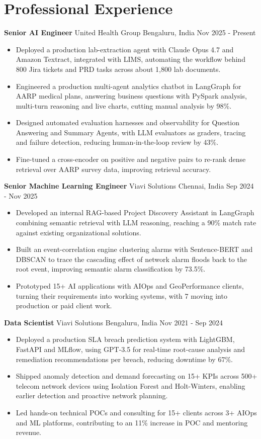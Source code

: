 \documentclass[10pt,a4paper]{article}
\newcommand{\role}[4]{\textbf{#1} \textbar{} #2 \hfill #3 \textbar{} #4\par}
\begin{document}
\section{Professional Experience}
\role{Senior AI Engineer}{United Health Group}{Bengaluru, India}{Nov 2025 - Present}
\begin{itemize}
  \item Deployed a production lab-extraction agent with Claude Opus 4.7 and Amazon Textract, integrated with LIMS, automating the workflow behind 800 Jira tickets and PRD tasks across about 1,800 lab documents.
  \item Engineered a production multi-agent analytics chatbot in LangGraph for AARP medical plans, answering business questions with PySpark analysis, multi-turn reasoning and live charts, cutting manual analysis by 98\%.
  \item Designed automated evaluation harnesses and observability for Question Answering and Summary Agents, with LLM evaluators as graders, tracing and failure detection, reducing human-in-the-loop review by 43\%.
  \item Fine-tuned a cross-encoder on positive and negative pairs to re-rank dense retrieval over AARP survey data, improving retrieval accuracy.
\end{itemize}
\vspace{3pt}
\role{Senior Machine Learning Engineer}{Viavi Solutions}{Chennai, India}{Sep 2024 - Nov 2025}
\begin{itemize}
  \item Developed an internal RAG-based Project Discovery Assistant in LangGraph combining semantic retrieval with LLM reasoning, reaching a 90\% match rate against existing organizational solutions.
  \item Built an event-correlation engine clustering alarms with Sentence-BERT and DBSCAN to trace the cascading effect of network alarm floods back to the root event, improving semantic alarm classification by 73.5\%.
  \item Prototyped 15+ AI applications with AIOps and GeoPerformance clients, turning their requirements into working systems, with 7 moving into production or paid client work.
\end{itemize}
\vspace{3pt}
\role{Data Scientist}{Viavi Solutions}{Bengaluru, India}{Nov 2021 - Sep 2024}
\begin{itemize}
  \item Deployed a production SLA breach prediction system with LightGBM, FastAPI and MLflow, using GPT-3.5 for real-time root-cause analysis and remediation recommendations per breach, reducing downtime by 67\%.
  \item Shipped anomaly detection and demand forecasting on 15+ KPIs across 500+ telecom network devices using Isolation Forest and Holt-Winters, enabling earlier detection and proactive network planning.
  \item Led hands-on technical POCs and consulting for 15+ clients across 3+ AIOps and ML platforms, contributing to an 11\% increase in POC and mentoring revenue.
\end{itemize}
\end{document}
